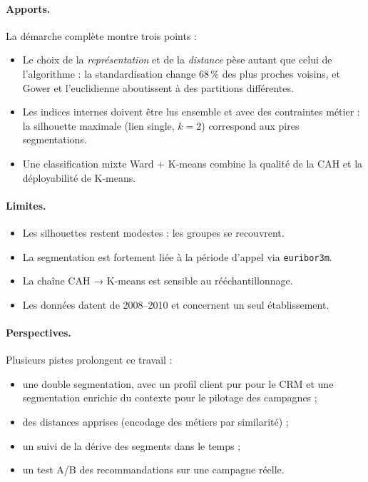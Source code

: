 \documentclass[11pt,a4paper]{article}
\begin{document}
\paragraph{Apports.} La démarche complète montre trois points :
\begin{itemize}
\item Le choix de la \emph{représentation} et de la \emph{distance} pèse autant que celui de l'algorithme : la standardisation change 68\,\% des plus proches voisins, et Gower et l'euclidienne aboutissent à des partitions différentes.
\item Les indices internes doivent être lus ensemble et avec des contraintes métier : la silhouette maximale (lien single, $k=2$) correspond aux pires segmentations.
\item Une classification mixte Ward + K-means combine la qualité de la CAH et la déployabilité de K-means.
\end{itemize}

\paragraph{Limites.}
\begin{itemize}
\item Les silhouettes restent modestes : les groupes se recouvrent.
\item La segmentation est fortement liée à la période d'appel via \texttt{euribor3m}.
\item La chaîne CAH → K-means est sensible au rééchantillonnage.
\item Les données datent de 2008–2010 et concernent un seul établissement.
\end{itemize}

\paragraph{Perspectives.} Plusieurs pistes prolongent ce travail :
\begin{itemize}
\item une double segmentation, avec un profil client pur pour le CRM et une segmentation enrichie du contexte pour le pilotage des campagnes ;
\item des distances apprises (encodage des métiers par similarité) ;
\item un suivi de la dérive des segments dans le temps ;
\item un test A/B des recommandations sur une campagne réelle.
\end{itemize}
\end{document}
